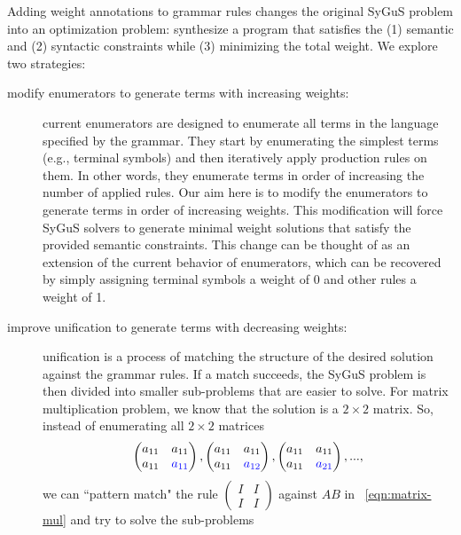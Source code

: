 Adding weight annotations to grammar rules changes the original SyGuS problem into an optimization problem:
%
synthesize a program that satisfies the (1) semantic and (2) syntactic constraints while (3) minimizing the total weight.
%
%
We explore two strategies:
%
\begin{description}
\item[modify enumerators to generate terms with increasing weights:]
%
current enumerators are designed to enumerate all terms in the language specified by the grammar.
%
They start by enumerating the simplest terms (e.g., terminal symbols) and then iteratively apply production rules on them.
%
In other words, they enumerate terms in order of increasing the number of applied rules.
%
Our aim here is to modify the enumerators to generate terms in order of increasing weights.
%
This modification will force SyGuS solvers to generate minimal weight solutions that satisfy the provided semantic constraints.
%
This change can be thought of as an extension of the current behavior of enumerators,
%
which can be recovered by simply assigning terminal symbols a weight of 0 and other rules a weight of 1.
%
\item[improve unification to generate terms with decreasing weights:]
%
unification is a process of matching the structure of the desired solution against the grammar rules.
%
If a match succeeds, the SyGuS problem is then divided into smaller sub-problems that are easier to solve.
%
For matrix multiplication problem, we know that the solution is a $2 \times 2$ matrix. So, instead of enumerating all $2 \times 2$ matrices
%
\begin{equation}
\begin{pmatrix} a_{11} & a_{11} \\ a_{11} & \textcolor{blue}{a_{11}} \end{pmatrix},
\begin{pmatrix} a_{11} & a_{11} \\ a_{11} & \textcolor{blue}{a_{12}} \end{pmatrix},
\begin{pmatrix} a_{11} & a_{11} \\ a_{11} & \textcolor{blue}{a_{21}} \end{pmatrix},
...,
\label{eq:sequence-matrices}
\end{equation}
%
we can ``pattern match" the rule $\begin{pmatrix} I & I \\ I & I \end{pmatrix}$ against $AB$ in ~\ref{eqn:matrix-mul} and try to solve the sub-problems

\end{description}
